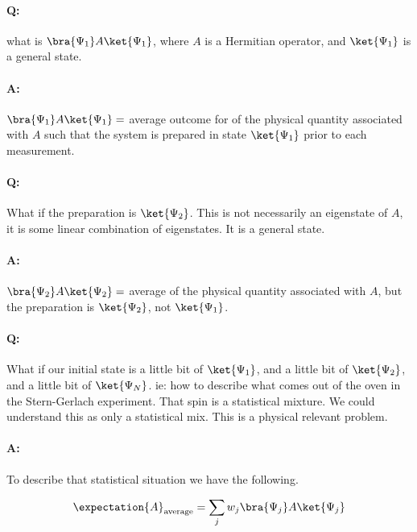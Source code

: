 \paragraph{Q:} what is $\bra{\Psi_1} A \ket{\Psi_1}$, where $A$ is a Hermitian operator, and $\ket{\Psi_1}$ is a general state.

\paragraph{A:} $\bra{\Psi_1} A \ket{\Psi_1} =$ average outcome for  of the physical quantity associated with $A$ such that the system is prepared in state $\ket{\Psi_1}$ prior to each measurement.

\paragraph{Q:}  What if the preparation is $\ket{\Psi_2}$.  This is not necessarily an eigenstate of $A$, it is some linear combination of eigenstates.  It is a general state.
\paragraph{A:}  $\bra{\Psi_2} A \ket{\Psi_2} = $ average of the physical quantity associated with $A$, but the preparation is $\ket{\Psi_2}$, not $\ket{\Psi_1}$.

\paragraph{Q:}  What if our initial state is a little bit of $\ket{\Psi_1}$, and a little bit of $\ket{\Psi_2}$, and a little bit of $\ket{\Psi_N}$.  ie: how to describe what comes out of the oven in the Stern-Gerlach experiment.  That spin is a statistical mixture.  We could understand this as only a statistical mix.  This is a physical relevant problem.
\paragraph{A:}  To describe that statistical situation we have the following.

\begin{equation}\label{eqn:PHY356HNov2:30}
\begin{aligned}
\expectation{A}_{\text{average}} = \sum_j w_j \bra{\Psi_j} A \ket{\Psi_j}
\end{aligned}
\end{equation}

